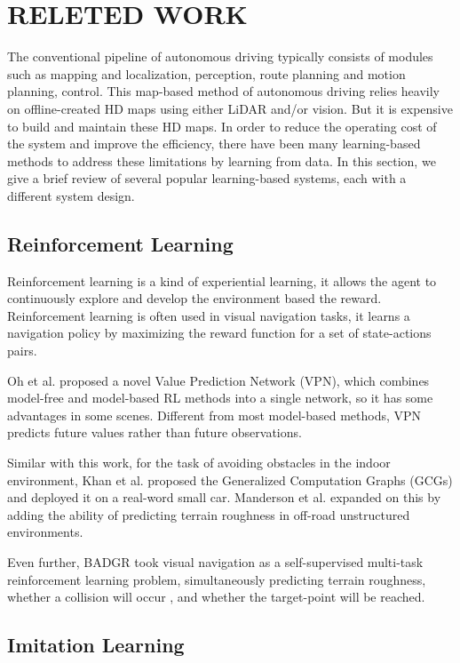 \documentclass[letterpaper,10 pt,conference]{ieeeconf}  %
\begin{document}
\section{RELETED WORK}\label{related}

The conventional pipeline of autonomous driving typically consists of modules such as mapping and localization\cite{7,8,9}, perception\cite{10,11,12,13,14}, route planning and motion planning\cite{15,16,17}, control\cite{18,19}. This map-based method of autonomous driving relies heavily on offline-created HD maps using either LiDAR and/or vision. But it is expensive to build and maintain these HD maps. In order to reduce the operating cost of the system and improve the efficiency, there have been many learning-based methods to address these limitations by learning from data. In this section, we give a brief review of several popular learning-based systems, each with a different system design.

\subsection{Reinforcement Learning}

Reinforcement learning is a kind of experiential learning, it allows the agent to continuously explore and develop the environment based the reward. Reinforcement learning is often used in visual navigation tasks, it learns a navigation policy by maximizing the reward function for a set of state-actions pairs.

Oh et al.\cite{20} proposed a novel Value Prediction Network (VPN), which combines model-free and model-based RL methods into a single network, so it has some advantages in some scenes. Different from most model-based methods, VPN predicts future values rather than future observations.

Similar with this work, for the task of avoiding obstacles in the indoor environment, Khan et al.\cite{21} proposed the Generalized Computation Graphs (GCGs) and deployed it on a real-word small car. Manderson et al.\cite{22} expanded on this by adding the ability of predicting terrain roughness in off-road unstructured environments.

Even further, BADGR\cite{6} took visual navigation as a self-supervised multi-task reinforcement learning problem, simultaneously predicting terrain roughness, whether a collision will occur , and whether the target-point will be reached.

\subsection{Imitation Learning}
\end{document}
